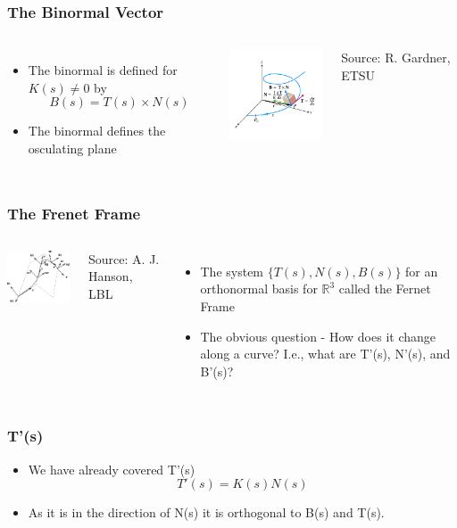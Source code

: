 \documentclass[10pt]{beamer}
\begin{document}
\begin{frame}
  \frametitle{The Binormal Vector}
  \begin{columns}
    \column{7cm}
    \begin{itemize}
    \item The binormal is defined for $K(s) \neq 0$ by
      \[
        B(s) = T(s) \times N(s)
      \]
    \item The binormal defines the osculating plane
    \end{itemize}
    \column{4cm}
    \vfill
    \centerline{\includegraphics[width=3.5cm]{binormal}}
    \vfill
    Source: R. Gardner, ETSU
  \end{columns}
\end{frame}

\begin{frame}
  \frametitle{The Frenet Frame}
  \begin{columns}
    \column{5cm}
    \vfill
    \centerline{\includegraphics[width=3.8cm]{frenet-frame}}
    \vfill
    Source: A. J. Hanson, LBL
    \column{6cm}
    \begin{itemize}
    \item The system $\{ T(s), N(s), B(s) \}$ for an orthonormal basis for $\mathbb{R}^3$ called the Fernet Frame
    \item The obvious question - How does it change along a curve? I.e., what are T'(s), N'(s), and B'(s)?
    \end{itemize}
  \end{columns}
\end{frame}

\begin{frame}
  \frametitle{T'(s)}
  \begin{itemize}
  \item We have already covered T'(s)
    \[
      T'(s) = K(s) N(s)
    \]

  \item As it is in the direction of N(s) it is orthogonal to B(s) and T(s). 
  \end{itemize}
\end{frame}
\end{document}
